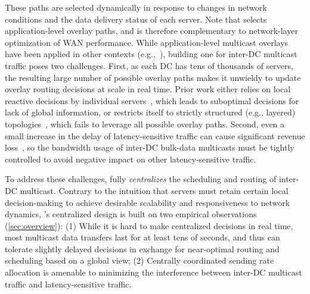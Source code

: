  These
paths are selected dynamically in response to changes in network
conditions and the data delivery status of each server. Note that
\name selects application-level overlay paths, and is therefore
complementary to network-layer optimization of WAN performance.
While application-level multicast overlays have been applied in other
contexts (e.g.,~\cite{Liebeherr2002Application,Wang2007mTreebone,
Andreev2013Designing,Mokhtarian2015Minimum}), building one for
inter-DC multicast traffic poses two challenges. First, as each DC
has tens of thousands of servers, the resulting large number of
possible overlay paths makes it unwieldy to update overlay routing
decisions at scale in real time. Prior work either relies on local
reactive decisions by individual servers~\cite{kostic2003bullet,
Repantis2010Scaling,Huang2014A}, which leads to suboptimal decisions
for lack of global information, or restricts itself to strictly
structured (e.g., layered) topologies~\cite{Nygren2010The}, which
fails to leverage all possible overlay paths. Second, even a small
increase in the delay of latency-sensitive traffic can cause
significant revenue loss~\cite{zhang2017communication}, so the bandwidth usage of inter-DC
bulk-data multicasts must be tightly controlled to avoid negative
impact on other latency-sensitive traffic.

To address these challenges, \name fully {\em centralizes} the
scheduling and routing of inter-DC multicast. Contrary to the
intuition that servers must retain certain local decision-making to
achieve desirable scalability and responsiveness to network dynamics,
\name's centralized design is built on two empirical observations
(\Section\ref{sec:overview}):
(1) While it is hard to make centralized decisions in real time, most
multicast data transfers last for at least tens of seconds, and thus
can tolerate slightly delayed decisions in exchange for near-optimal
routing and scheduling based on a global view;
(2) Centrally coordinated sending rate allocation is amenable to
minimizing the interference between inter-DC multicast traffic and
latency-sensitive traffic.

